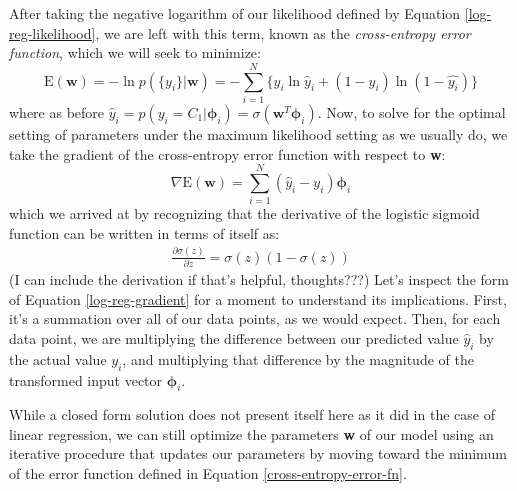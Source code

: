 
After taking the negative logarithm of our likelihood defined by Equation \ref{log-reg-likelihood}, we are left with this term, known as the \textit{cross-entropy error function}, which we will seek to minimize:
\begin{equation} \label{cross-entropy-error-fn}
	\mathrm{E}(\textbf{w}) = - \ln{p(\{y_{i}\}|\textbf{w})} = - \sum_{i=1}^{N} \{y_{i}\ln{\hat{y}_i} + (1 - y_{i})\ln{(1-\hat{y_{i}})}\}
\end{equation}
where as before $\hat{y}_{i} = p(y_{i}=C_{1}|\boldsymbol{\phi}_{i}) = \sigma(\textbf{w}^{T}\boldsymbol{\phi}_{i})$. Now, to solve for the optimal setting of parameters under the maximum likelihood setting as we usually do, we take the gradient of the cross-entropy error function with respect to \textbf{w}:
\begin{equation} \label{log-reg-gradient}
	\nabla \mathrm{E}(\textbf{w}) = \sum_{i=1}^{N}(\hat{y}_{i} - y_{i})\boldsymbol{\phi}_{i}
\end{equation}
which we arrived at by recognizing that the derivative of the logistic sigmoid function can be written in terms of itself as:
\begin{align*}
	\frac{\partial \sigma(z)}{\partial z} = \sigma(z)(1 - \sigma(z))
\end{align*}
(I can include the derivation if that's helpful, thoughts???) Let's inspect the form of Equation \ref{log-reg-gradient} for a moment to understand its implications. First, it's a summation over all of our data points, as we would expect. Then, for each data point, we are multiplying the difference between our predicted value $\hat{y}_{i}$ by the actual value $y_{i}$, and multiplying that difference by the magnitude of the transformed input vector $\boldsymbol{\phi}_{i}$.

While a closed form solution does not present itself here as it did in the case of linear regression, we can still optimize the parameters \textbf{w} of our model using an iterative procedure that updates our parameters by moving toward the minimum of the error function defined in Equation \ref{cross-entropy-error-fn}.

